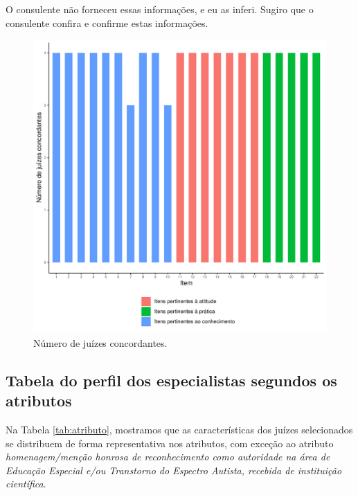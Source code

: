 \documentclass[
]{article}
\begin{document}
O consulente não forneceu essas informações, e eu as inferi. Sugiro que o consulente confira e confirme estas informações.

\begin{figure}[htbp]

{\centering \includegraphics[width=0.75\linewidth]{figures/grafico3} 

}

\caption{Número de juízes concordantes.}\label{fig:grafico3}
\end{figure}

\newpage

\hypertarget{tabela-do-perfil-dos-especialistas-segundos-os-atributos}{%
\subsection{Tabela do perfil dos especialistas segundos os atributos}\label{tabela-do-perfil-dos-especialistas-segundos-os-atributos}}

Na Tabela \ref{tab:atributo}, mostramos que as características dos juízes selecionados se distribuem de forma representativa nos atributos, com exceção ao atributo \emph{homenagem/menção honrosa de reconhecimento como autoridade na área de Educação Especial e/ou Transtorno do Espectro Autista, recebida de instituição científica}.
\end{document}
